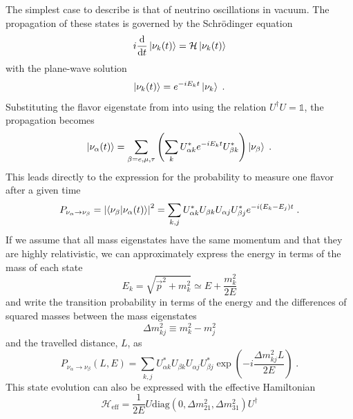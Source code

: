 The simplest case to describe is that of neutrino oscillations in vacuum. The propagation of these states is governed by the Schrödinger equation
\begin{equation}
    i \dv{t} \ket{\nu_k(t)} = \mathcal{H} \ket{\nu_k(t)}
\end{equation}
with the plane-wave solution
\begin{equation}
    \ket{\nu_k(t)} = e^{-iE_k t} \ket{\nu_k}\;.\label{eq:schrodinger-eq}
\end{equation}
Substituting the flavor eigenstate from  into  using the relation $U^\dag U=\mathbb{1}$, the propagation becomes
\begin{equation}
    \ket{\nu_\alpha(t)} = \sum_{\beta=e,\mu,\tau} \left(\sum_k U^*_{\alpha k} e^{-iE_k t}  U^*_{\beta k}\right) \ket{\nu_\beta}\;.\label{eq:flav-evolution}
\end{equation}
This leads directly to the expression for the probability to measure one flavor after a given time
\begin{equation}
    P_{\nu_\alpha \rightarrow \nu_\beta} = \abs{\braket{\nu_\beta}{\nu_\alpha(t)}}^2
    = \sum_{k,j}U^*_{\alpha k}U_{\beta k}U_{\alpha j}U_{\beta j}^* e^{-i(E_k - E_j)t}\;.
\end{equation}
If we assume that all mass eigenstates have the same momentum and that they are highly relativistic, we can approximately express the energy in terms of the mass of each state
\begin{equation}
    E_k = \sqrt{\vec{p}^2 + m_k^2} \simeq E + \frac{m_k^2}{2E}
\end{equation}
and write the transition probability in terms of the energy and the differences of squared masses between the mass eigenstates
\begin{equation}
    \Delta m_{kj}^2 \equiv m_k^2 - m_j^2
\end{equation}
and the travelled distance, $L$, as
\begin{equation}
    P_{\nu_\alpha \rightarrow \nu_\beta}(L,E) = \sum_{k,j}U^*_{\alpha k}U_{\beta k}U_{\alpha j}U_{\beta j}^* \exp(-i\frac{\Delta m_{kj}^2 L}{2E})\;.\label{eq:vac-oscprob}
\end{equation}
This state evolution can also be expressed with the effective Hamiltonian
\begin{equation}
    \mathcal{H}_\mathrm{eff} = \frac{1}{2E}U\mathrm{diag}(0,\Delta m_{21}^2, \Delta m_{31}^2)U^\dag
\end{equation}

